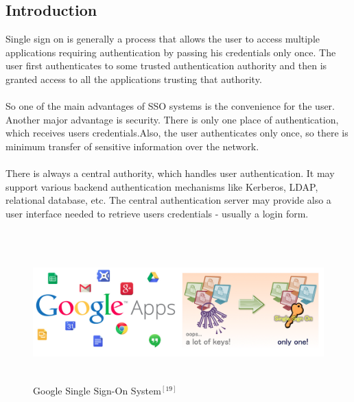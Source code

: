 \documentclass[12pt]{report}
\begin{document}
\subsection{Introduction}
	Single sign on is generally a process that allows the user to access multiple 
applications requiring authentication by passing his credentials only once. The 
user first authenticates to some trusted authentication authority and then is 
granted access to all the applications trusting that authority.\\
\\
	So one of the main advantages of SSO systems is the convenience for the user. 
Another major advantage is security. There is only one place of authentication, 
which receives users credentials.Also, the user authenticates only once, so there is minimum transfer of sensitive information over the network.\\
\\
There is always a central authority, which handles user authentication. It may 
support various backend authentication mechanisms like Kerberos, LDAP, relational database, etc. The central authentication server may provide also a user interface needed to retrieve users credentials - usually a login form.\\
\\
\begin{figure}[H]
\includegraphics[width=15cm,height=5.3cm]{SSO}
\caption{Google Single Sign-On System$ ^{[19]}$\label{fig: Google Single Sign-On System}}
\end{figure}
\pagebreak
\end{document}
